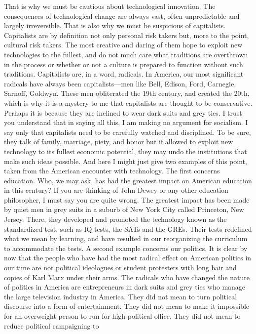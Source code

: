 That is why we must be cautious about technological innovation. The consequences of technological
change are always vast, often unpredictable and largely irreversible. That is also why we must be
suspicious of capitalists. Capitalists are by definition not only personal risk takers but, more to the point,
cultural risk takers. The most creative and daring of them hope to exploit new technologies to the fullest,
and do not much care what traditions are overthrown in the process or whether or not a culture is prepared
to function without such traditions. Capitalists are, in a word, radicals. In America, our most significant
radicals have always been capitalists—men like Bell, Edison, Ford, Carnegie, Sarnoff, Goldwyn. These
men obliterated the 19th century, and created the 20th, which is why it is a mystery to me that capitalists
are thought to be conservative. Perhaps it is because they are inclined to wear dark suits and grey ties.
I trust you understand that in saying all this, I am making no argument for socialism. I say only that
capitalists need to be carefully watched and disciplined. To be sure, they talk of family, marriage, piety,
and honor but if allowed to exploit new technology to its fullest economic potential, they may undo the
institutions that make such ideas possible. And here I might just give two examples of this point, taken
from the American encounter with technology. The first concerns education. Who, we may ask, has had the
greatest impact on American education in this century? If you are thinking of John Dewey or any other
education philosopher, I must say you are quite wrong. The greatest impact has been made by quiet men in
grey suits in a suburb of New York City called Princeton, New Jersey. There, they developed and promoted
the technology known as the standardized test, such as IQ tests, the SATs and the GREs. Their tests
redefined what we mean by learning, and have resulted in our reorganizing the curriculum to accommodate
the tests.
A second example concerns our politics. It is clear by now that the people who have had the most radical
effect on American politics in our time are not political ideologues or student protesters with long hair and
copies of Karl Marx under their arms. The radicals who have changed the nature of politics in America are
entrepreneurs in dark suits and grey ties who manage the large television industry in America. They did not
mean to turn political discourse into a form of entertainment. They did not mean to make it impossible for
an overweight person to run for high political office. They did not mean to reduce political campaigning to
